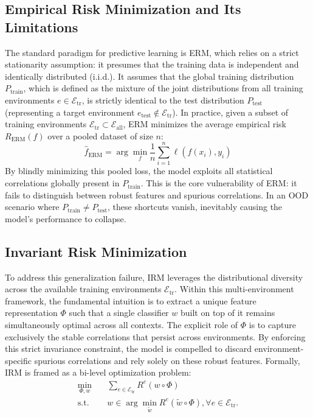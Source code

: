 \documentclass[11pt]{article}
\theoremstyle{definition}
\theoremstyle{plain}
\begin{document}
\subsection{Empirical Risk Minimization and Its Limitations}

The standard paradigm for predictive learning is ERM, which relies on a strict stationarity assumption: it presumes that the training data is independent and identically distributed (i.i.d.). It assumes that the global training distribution $P_{\text{train}}$, which is defined as the mixture of the joint distributions from all training environments $e \in \mathcal{E}_{\text{tr}}$, is strictly identical to the test distribution $P_{\text{test}}$ (representing a target environment $e_{\text{test}} \notin \mathcal{E}_{\text{tr}}$). In practice, given a subset of training environments $\mathcal{E}_{\text{tr}} \subset \mathcal{E}_{\text{all}}$, ERM minimizes the average empirical risk $R_{\text{ERM}}(f)$ over a pooled dataset of size $n$:
\begin{equation}
\hat{f}_{\text{ERM}} = \arg\min_f \frac{1}{n} \sum_{i=1}^n \ell(f(x_i), y_i)
\label{eq:erm}
\end{equation}
By blindly minimizing this pooled loss, the model exploits all statistical correlations globally present in $P_{\text{train}}$. This is the core vulnerability of ERM: it fails to distinguish between robust features and spurious correlations. In an OOD scenario where $P_{\text{train}} \neq P_{\text{test}}$, these shortcuts vanish, inevitably causing the model's performance to collapse.


\subsection{Invariant Risk Minimization}
\label{sec:irm}

To address this generalization failure, IRM leverages the distributional diversity across the available training environments $\mathcal{E}_{\text{tr}}$. Within this multi-environment framework, the fundamental intuition is to extract a unique feature representation $\Phi$ such that a single classifier $w$ built on top of it remains simultaneously optimal across all contexts. The explicit role of $\Phi$ is to capture exclusively the stable correlations that persist across environments. By enforcing this strict invariance constraint, the model is compelled to discard environment-specific spurious correlations and rely solely on these robust features. Formally, IRM is framed as a bi-level optimization problem:
\begin{equation}
\begin{aligned}
\min_{\Phi, w} \quad & \sum_{e \in \mathcal{E}_{\text{tr}}} R^e(w \circ \Phi) \\
\text{s.t.} \quad & w \in \arg\min_{\tilde{w}} R^e(\tilde{w} \circ \Phi), \forall e \in \mathcal{E}_{\mathrm{tr}}.
\end{aligned}
\label{eq:irm-bilevel}
\end{equation}
\end{document}
